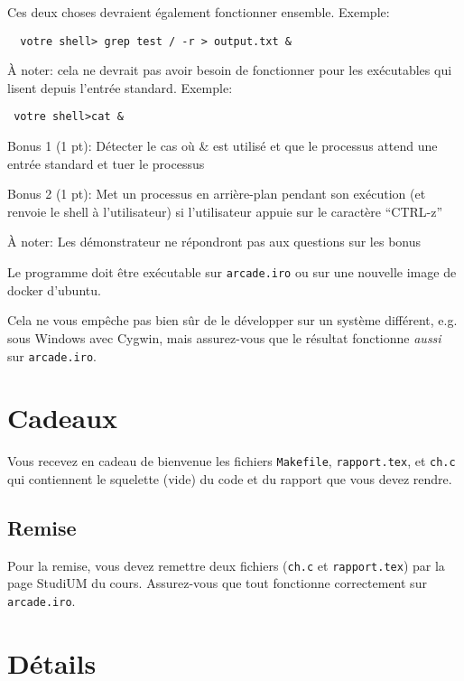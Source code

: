 \documentclass{article}
\begin{document}
\begin{enumerate}
Ces deux choses devraient également fonctionner ensemble. Exemple:
\begin{verbatim}
  votre shell> grep test / -r > output.txt &
\end{verbatim}

À noter: cela ne devrait pas avoir besoin de fonctionner pour les exécutables qui lisent depuis l'entrée standard. Exemple:
\begin{verbatim}
 votre shell>cat &
\end{verbatim}  


Bonus 1 (1 pt): Détecter le cas où \& est utilisé et que le processus attend une entrée standard et tuer le processus 

Bonus 2 (1 pt): Met un processus en arrière-plan pendant son exécution (et renvoie le shell à l'utilisateur) si l'utilisateur appuie sur le caractère ``CTRL-z''


À noter:
Les démonstrateur ne répondront pas aux questions sur les bonus

\end{enumerate}


Le programme doit être exécutable sur \texttt{arcade.iro} ou sur une nouvelle image de docker d'ubuntu.

Cela ne vous empêche pas bien sûr de le développer sur un système différent,
e.g. sous Windows avec Cygwin, mais assurez-vous que le résultat fonctionne
\emph{aussi} sur \texttt{arcade.iro}.

\section{Cadeaux}

Vous recevez en cadeau de bienvenue les fichiers \texttt{Makefile},
\texttt{rapport.tex}, et \texttt{ch.c} qui contiennent le squelette (vide)
du code et du rapport que vous devez rendre.

\subsection{Remise}

Pour la remise, vous devez remettre deux fichiers (\texttt{ch.c} et
\texttt{rapport.tex}) par la page  StudiUM du cours.
Assurez-vous que tout fonctionne correctement sur \texttt{arcade.iro}.

\section{Détails}
\end{document}
